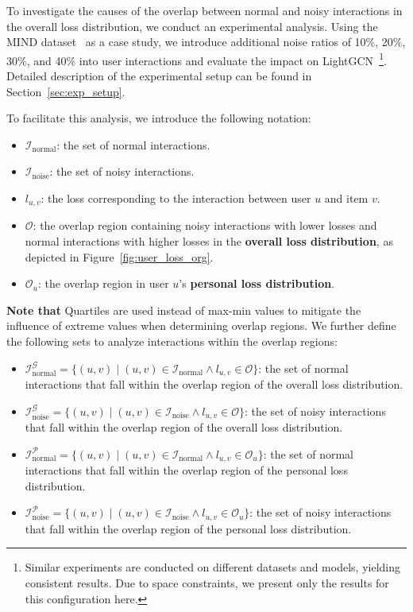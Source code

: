 To investigate the causes of the overlap between normal and noisy interactions in the overall loss distribution, we conduct an experimental analysis. Using the MIND dataset~\cite{wu2020mind} as a case study, we introduce additional noise ratios of 10\%, 20\%, 30\%, and 40\% into user interactions and evaluate the impact on LightGCN~\cite{he2020lightgcn}\footnote{Similar experiments are conducted on different datasets and models, yielding consistent results. Due to space constraints, we present only the results for this configuration here.}. Detailed description of the experimental setup can be found in Section~\ref{sec:exp_setup}.

To facilitate this analysis, we introduce the following notation:
\begin{itemize}[leftmargin=*]
    \item $\mathcal{I}_{\text{normal}}$: the set of normal interactions.
    \item $\mathcal{I}_{\text{noise}}$: the set of noisy interactions.
    \item $l_{u,v}$: the loss corresponding to the interaction between user $u$ and item $v$.
    \item $\mathcal{O}$: the overlap region containing noisy interactions with lower losses and normal interactions with higher losses in the \textbf{overall loss distribution}, as depicted in Figure~\ref{fig:user_loss_org}.
    \item $\mathcal{O}_{u}$: the overlap region in user $u$'s \textbf{personal loss distribution}.
\end{itemize}
\textbf{Note that} Quartiles are used instead of max-min values to mitigate the influence of extreme values when determining overlap regions.
We further define the following sets to analyze interactions within the overlap regions:
\begin{itemize}[leftmargin=*]
    \item $\mathcal{I}^{\mathcal{G}}_{\text{normal}} = \{ (u, v) \mid (u, v) \in \mathcal{I}_{\text{normal}} \land l_{u,v} \in \mathcal{O}\}$: the set of normal interactions that fall within the overlap region of the overall loss distribution.
    \item $\mathcal{I}^{\mathcal{G}}_{\text{noise}} = \{ (u, v) \mid (u, v) \in \mathcal{I}_{\text{noise}} \land l_{u,v} \in \mathcal{O} \}$: the set of noisy interactions that fall within the overlap region of the overall loss distribution.
    \item $\mathcal{I}^{\mathcal{P}}_{\text{normal}} = \{ (u, v) \mid (u, v) \in \mathcal{I}_{\text{normal}} \land l_{u,v} \in \mathcal{O}_{u} \}$: the set of normal interactions that fall within the overlap region of the personal loss distribution.
    \item $\mathcal{I}^{\mathcal{P}}_{\text{noise}} = \{ (u, v) \mid (u, v) \in \mathcal{I}_{\text{noise}} \land l_{u,v} \in \mathcal{O}_{u} \}$: the set of noisy interactions that fall within the overlap region of the personal loss distribution.
\end{itemize}
